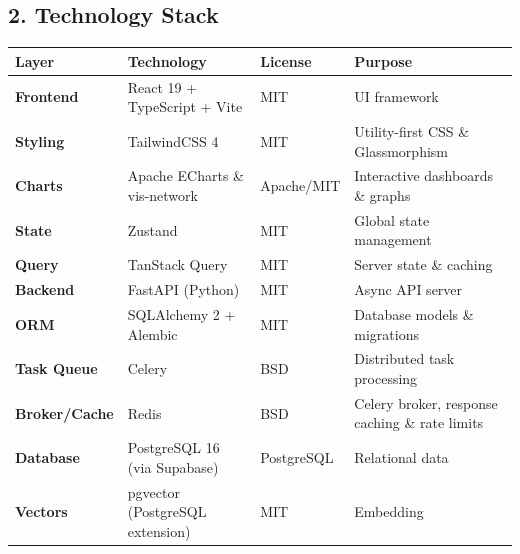 \documentclass[
]{article}
\newcounter{none} %
\begin{document}
\subsection{2. Technology Stack}\label{technology-stack}

{\def\LTcaptype{none} %
\begin{longtable}[]{@{}
  >{\raggedright\arraybackslash}p{}
  >{\raggedright\arraybackslash}p{}
  >{\raggedright\arraybackslash}p{}
  >{\raggedright\arraybackslash}p{}@{}}
\toprule\noalign{}
\begin{minipage}[b]{\linewidth}\raggedright
Layer
\end{minipage} & \begin{minipage}[b]{\linewidth}\raggedright
Technology
\end{minipage} & \begin{minipage}[b]{\linewidth}\raggedright
License
\end{minipage} & \begin{minipage}[b]{\linewidth}\raggedright
Purpose
\end{minipage} \\
\midrule\noalign{}
\endhead
\bottomrule\noalign{}
\endlastfoot
\textbf{Frontend} & React 19 + TypeScript + Vite & MIT & UI framework \\
\textbf{Styling} & TailwindCSS 4 & MIT & Utility-first CSS \&
Glassmorphism \\
\textbf{Charts} & Apache ECharts \& vis-network & Apache/MIT &
Interactive dashboards \& graphs \\
\textbf{State} & Zustand & MIT & Global state management \\
\textbf{Query} & TanStack Query & MIT & Server state \& caching \\
\textbf{Backend} & FastAPI (Python) & MIT & Async API server \\
\textbf{ORM} & SQLAlchemy 2 + Alembic & MIT & Database models \&
migrations \\
\textbf{Task Queue} & Celery & BSD & Distributed task processing \\
\textbf{Broker/Cache} & Redis & BSD & Celery broker, response caching \&
rate limits \\
\textbf{Database} & PostgreSQL 16 (via Supabase) & PostgreSQL &
Relational data \\
\textbf{Vectors} & pgvector (PostgreSQL extension) & MIT & Embedding

\end{longtable}}
\end{document}
